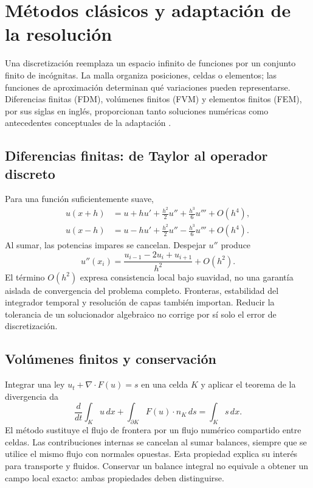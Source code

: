 \section{Métodos clásicos y adaptación de la resolución}
Una discretización reemplaza un espacio infinito de funciones por un conjunto finito de incógnitas. La malla organiza posiciones, celdas o elementos; las funciones de aproximación determinan qué variaciones pueden representarse. Diferencias finitas (FDM), volúmenes finitos (FVM) y elementos finitos (FEM), por sus siglas en inglés, proporcionan tanto soluciones numéricas como antecedentes conceptuales de la adaptación \cite{fenics2016}.

\subsection{Diferencias finitas: de Taylor al operador discreto}
Para una función suficientemente suave,
\begin{align}
u(x+h)&=u+hu'+\tfrac{h^2}{2}u''+\tfrac{h^3}{6}u'''+O(h^4),\\
u(x-h)&=u-hu'+\tfrac{h^2}{2}u''-\tfrac{h^3}{6}u'''+O(h^4).
\end{align}
Al sumar, las potencias impares se cancelan. Despejar $u''$ produce
\begin{equation}
u''(x_i)=\frac{u_{i-1}-2u_i+u_{i+1}}{h^2}+O(h^2).
\end{equation}
El término $O(h^2)$ expresa consistencia local bajo suavidad, no una garantía aislada de convergencia del problema completo. Fronteras, estabilidad del integrador temporal y resolución de capas también importan. Reducir la tolerancia de un solucionador algebraico no corrige por sí solo el error de discretización.

\subsection{Volúmenes finitos y conservación}
Integrar una ley $u_t+\nabla\cdot F(u)=s$ en una celda $K$ y aplicar el teorema de la divergencia da
\begin{equation}
\frac{d}{dt}\int_Ku\,dx+\int_{\partial K}F(u)\cdot n_K\,ds=\int_Ks\,dx.
\end{equation}
El método sustituye el flujo de frontera por un flujo numérico compartido entre celdas. Las contribuciones internas se cancelan al sumar balances, siempre que se utilice el mismo flujo con normales opuestas. Esta propiedad explica su interés para transporte y fluidos. Conservar un balance integral no equivale a obtener un campo local exacto: ambas propiedades deben distinguirse.

